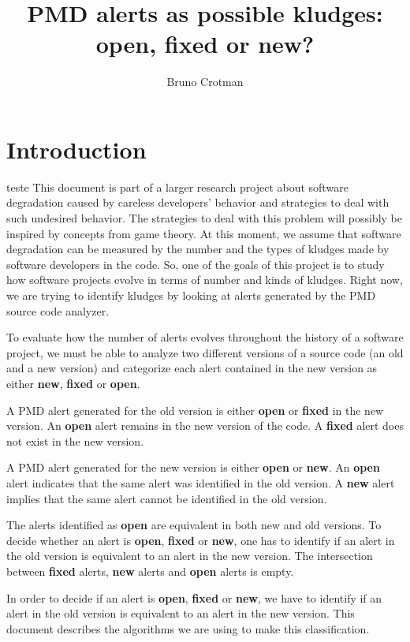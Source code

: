 \documentclass[
]{article}
\title{PMD alerts as possible kludges: open, fixed or new?}
\author{Bruno Crotman}
\date{}
\begin{document}
\maketitle

{
\setcounter{tocdepth}{3}
\tableofcontents
}
\small

\normalsize

\section{Introduction}\label{intro}

teste This document is part of a larger research project about software
degradation caused by careless developers' behavior and strategies to
deal with such undesired behavior. The strategies to deal with this
problem will possibly be inspired by concepts from game theory. At this
moment, we assume that software degradation can be measured by the
number and the types of kludges made by software developers in the code.
So, one of the goals of this project is to study how software projects
evolve in terms of number and kinds of kludges. Right now, we are trying
to identify kludges by looking at alerts generated by the PMD source
code analyzer.

To evaluate how the number of alerts evolves throughout the history of a
software project, we must be able to analyze two different versions of a
source code (an old and a new version) and categorize each alert
contained in the new version as either \textbf{new}, \textbf{fixed} or
\textbf{open}.

A PMD alert generated for the old version is either \textbf{open} or
\textbf{fixed} in the new version. An \textbf{open} alert remains in the
new version of the code. A \textbf{fixed} alert does not exist in the
new version.

A PMD alert generated for the new version is either \textbf{open} or
\textbf{new}. An \textbf{open} alert indicates that the same alert was
identified in the old version. A \textbf{new} alert implies that the
same alert cannot be identified in the old version.

The alerts identified as \textbf{open} are equivalent in both new and
old versions. To decide whether an alert is \textbf{open},
\textbf{fixed} or \textbf{new}, one has to identify if an alert in the
old version is equivalent to an alert in the new version. The
intersection between \textbf{fixed} alerts, \textbf{new} alerts and
\textbf{open} alerts is empty.

In order to decide if an alert is \textbf{open}, \textbf{fixed} or
\textbf{new}, we have to identify if an alert in the old version is
equivalent to an alert in the new version. This document describes the
algorithms we are using to make this classification.
\end{document}
